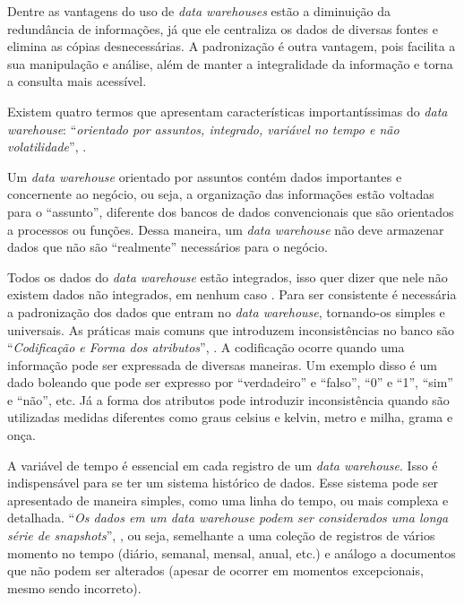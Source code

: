 Dentre as vantagens do uso de \textit{data warehouses} estão a diminuição da redundância de informações, já que ele centraliza os dados de diversas fontes e elimina as cópias desnecessárias. A padronização é outra vantagem, pois facilita a sua manipulação e análise, além de manter a integralidade da informação e torna a consulta mais acessível.

Existem quatro termos que apresentam características importantíssimas do \textit{data warehouse}: \enquote{\textit{orientado por assuntos, integrado, variável no tempo e não volatilidade}}, \cite{vida2021datawarehouse}.

Um \textit{data warehouse} orientado por assuntos contém dados importantes e concernente ao negócio, ou seja, a organização das informações estão voltadas para o \enquote{assunto}, diferente dos bancos de dados convencionais que são orientados a processos ou funções. Dessa maneira, um \textit{data warehouse} não deve armazenar dados que não são \enquote{realmente} necessários para o negócio.

Todos os dados do \textit{data warehouse} estão integrados, isso quer dizer que nele não existem dados não integrados, em nenhum caso \cite{turban2009business}. Para ser consistente é necessária a padronização dos dados que entram no \textit{data warehouse}, tornando-os simples e universais. As práticas mais comuns que introduzem inconsistências no banco são \enquote{\textit{Codificação e Forma dos atributos}}, \cite{vida2021datawarehouse}. A codificação ocorre quando uma informação pode ser expressada de diversas maneiras. Um exemplo disso é um dado boleando que pode ser expresso por \enquote{verdadeiro} e \enquote{falso}, \enquote{0} e \enquote{1}, \enquote{sim} e \enquote{não}, etc. Já a forma dos atributos pode introduzir inconsistência quando são utilizadas medidas diferentes como graus celsius e kelvin, metro e milha, grama e onça.

A variável de tempo é essencial em cada registro de um \textit{data warehouse}. Isso é indispensável para se ter um sistema histórico de dados. Esse sistema pode ser apresentado de maneira simples, como uma linha do tempo, ou mais complexa e detalhada. \enquote{\textit{Os dados em um data warehouse podem ser considerados uma longa série de snapshots}}, \cite{boscarioli2016mineracao}, ou seja, semelhante a uma coleção de registros de vários momento no tempo (diário, semanal, mensal, anual, etc.) e análogo a documentos que não podem ser alterados (apesar de ocorrer em momentos excepcionais, mesmo sendo incorreto).


